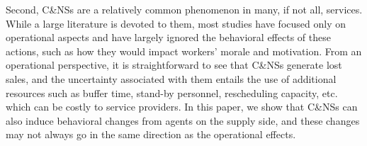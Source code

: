 \documentclass[reviewmode]{AEA}
\begin{document}
Second,  C\&NSs are a relatively common phenomenon in many, if not all, services. While a large literature is devoted to them,  most studies \citep{moore2001time,liu2010dynamic,feldman2014appointment,zacharias2014appointment} have focused only on operational aspects and have largely ignored the behavioral effects of these actions, such as how they would impact workers' morale and motivation.
From an operational perspective, it is straightforward to see that C\&NSs generate lost sales, and the uncertainty associated with them entails the use of additional resources such as buffer time, stand-by personnel, rescheduling capacity, etc. which can be costly to service providers.
In this paper, we show that C\&NSs can also induce behavioral changes from agents on the supply side, and these changes may not always go in the same direction as the operational effects.

\end{document}
